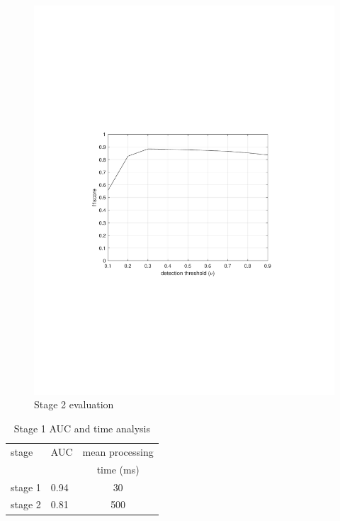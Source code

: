 \begin{figure}
    \centering
    \includegraphics[width=\linewidth,trim={100 240 100 250},clip]{images/f1-analysis-s2}
    \caption{Stage 2 evaluation}
    \label{fig:f1-analysis-s2}
\end{figure}



\begin{table}
\centering
\caption{Stage 1 AUC and time analysis} \vspace{5pt}
\label{table:auc-time-analysis-s1}
\begin{tabular}{|l|l|c|}
\hline
stage   	& AUC     & mean processing \\
            &         &  time (ms)  \\ \hline \hline
stage 1     & 0.94    & 30    \\
stage 2     & 0.81    & 500  \\ \hline
\end{tabular}
\end{table}


